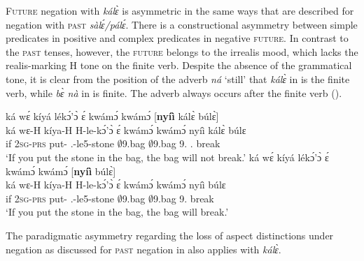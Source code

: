 \textsc{Future} negation with {\itshape kálɛ̀} is asymmetric in the same ways that are described for negation with \textsc{past} {\itshape sàlɛ́/pálɛ́}. There is a constructional asymmetry between simple predicates in positive and complex predicates in negative \textsc{future}. In contrast to the \textsc{past} tenses, however, the \textsc{future} belongs to the irrealis mood, which lacks the realis-marking H tone on the finite verb. Despite the absence of the grammatical tone, it is clear from the position of the adverb {\itshape ná} `still' that {\itshape kálɛ̀} in  is the finite verb, while {\itshape bɛ̀ nà} in  is finite. The adverb always occurs after the finite verb ().

\ea\label{kale2}
\ea \label{kale2a}
  \glll  ká wɛ́ kíyá lékɔ́'ɔ̀ ɛ́ kwámɔ́ kwámɔ́ [{\bfseries nyíì} kálɛ̀ búlɛ̀]\\
        ká wɛ-H kíya-H H-le-kɔ́'ɔ̀ ɛ́ kwámɔ́ kwámɔ́ {\db}nyíì kálɛ̀ búlɛ \\
           if 2\textsc{sg}-\textsc{prs} put-{\R} {\OBJ}.{\LINK}-le5-stone {\LOC} $\emptyset$9.bag $\emptyset$9.bag {\db}9.{\FUT} {\NEG}.{\FUT} break\\
    \trans `If you put the stone in the bag, the bag will not break.'
\ex\label{kale2b}
  \glll  ká wɛ́ kíyá lékɔ́'ɔ̀ ɛ́ kwámɔ́ kwámɔ́ [{\bfseries nyíì} búlɛ̀] \\
        ká wɛ-H kíya-H H-le-kɔ́'ɔ̀ ɛ́ kwámɔ́ kwámɔ́ {\db}nyíì búlɛ \\
           if 2\textsc{sg}-\textsc{prs} put-{\R} {\OBJ}.{\LINK}-le5-stone {\LOC} $\emptyset$9.bag $\emptyset$9.bag {\db}9.{\FUT} break\\
    \trans `If you put the stone in the bag, the bag will break.'
\z
\z

The paradigmatic asymmetry regarding the loss of aspect distinctions under negation as discussed for \textsc{past} negation in  also applies with {\itshape kálɛ̀}.









